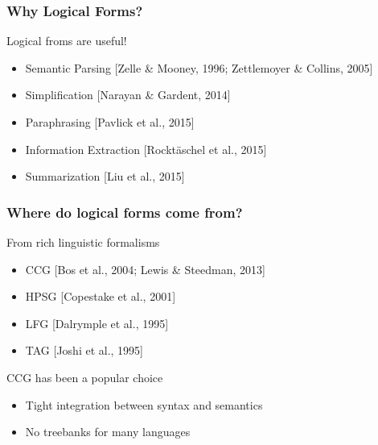 \documentclass[mathserif,12pt]{beamer}
\begin{document}
\begin{frame}
 \frametitle{Why Logical Forms?}
Logical froms are useful!
\begin{itemize}
 \vspace{0.5em}
 \item Semantic Parsing {\scriptsize [Zelle \& Mooney, 1996; Zettlemoyer \& Collins, 2005]}
 
 \vspace{0.5em}
 \item Simplification {\scriptsize [Narayan \& Gardent, 2014]}
 
 \vspace{0.5em}
 \item Paraphrasing {\scriptsize [Pavlick et al., 2015]}
 
 \vspace{0.5em}
 \item Information Extraction {\scriptsize [Rockt\"aschel et al., 2015]}
 
 \vspace{0.5em}
 \item Summarization {\scriptsize [Liu et al., 2015]}
\end{itemize}
\end{frame}

\begin{frame}
 \frametitle{Where do logical forms come from?}
 From rich linguistic formalisms
 \begin{itemize}
  \vspace{0.5em}
  \item CCG {\scriptsize [Bos et al., 2004; Lewis \& Steedman, 2013]}
  
  \vspace{0.5em}
  \item HPSG {\scriptsize [Copestake et al., 2001]}
  
  \vspace{0.5em}
  \item LFG {\scriptsize [Dalrymple et al., 1995]}
  
  \vspace{0.5em}
  \item TAG {\scriptsize [Joshi et al., 1995]}
 \end{itemize}
 
 \vspace{0.5cm}
 
 CCG has been a popular choice
 \vspace{0.5em}
 \begin{itemize}
  \item Tight integration between syntax and semantics
  
  \vspace{0.5em}
  \item<2> \alert{No treebanks} for many languages
 \end{itemize}
\end{frame}
\end{document}
